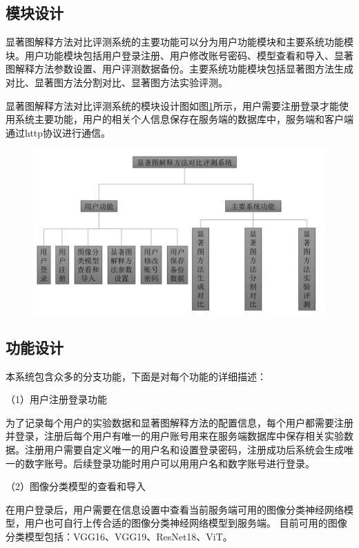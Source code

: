 \subsection{模块设计}
显著图解释方法对比评测系统的主要功能可以分为用户功能模块和主要系统功能模块。用户功能模块包括用户登录注册、用户修改账号密码、模型查看和导入、显著图解释方法参数设置、用户评测数据备份。主要系统功能模块包括显著图方法生成对比、显著图方法分割对比、显著图方法实验评测。

显著图解释方法对比评测系统的模块设计图如图\ref{fig:function}所示，用户需要注册登录才能使用系统主要功能，用户的相关个人信息保存在服务端的数据库中，服务端和客户端通过http协议进行通信。

\begin{figure}[h]
	\centering 
	\includegraphics[width=15cm]{fig/ch5/function.png}
	\label{fig:function}
\end{figure}

\subsection{功能设计}

本系统包含众多的分支功能，下面是对每个功能的详细描述：

（1）用户注册登录功能

为了记录每个用户的实验数据和显著图解释方法的配置信息，每个用户都需要注册并登录，注册后每个用户有唯一的用户账号用来在服务端数据库中保存相关实验数据。注册用户需要自定义唯一的用户名和设置登录密码，注册成功后系统会生成唯一的数字账号。后续登录功能时用户可以用用户名和数字账号进行登录。

（2）图像分类模型的查看和导入

在用户登录后，用户需要在信息设置中查看当前服务端可用的图像分类神经网络模型，用户也可自行上传合适的图像分类神经网络模型到服务端。
目前可用的图像分类模型包括：VGG16、VGG19、ResNet18、ViT。

